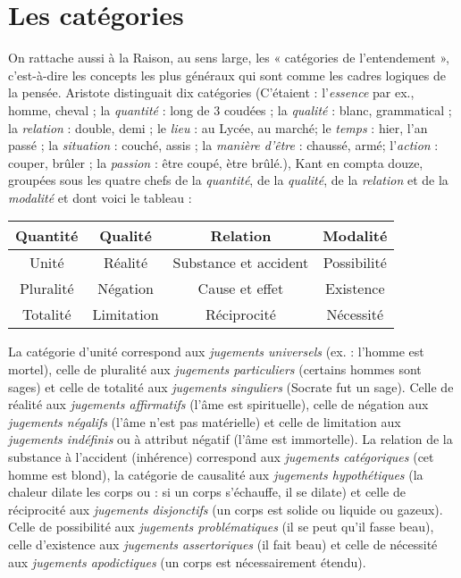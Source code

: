 \section{Les catégories}%
On rattache aussi à la Raison, au sens
large, les « catégories de l’entendement », c’est-à-dire les concepts les
plus généraux qui sont comme les cadres logiques de la pensée.
Aristote distinguait dix catégories {\scriptsize (C'étaient : l'{\it essence} par ex., homme, cheval ; la {\it quantité} : long de 3 coudées ; la
{\it qualité} : blanc, grammatical ; la {\it relation} : double, demi ; le {\it lieu} : au Lycée, au marché;
le {\it temps} : hier, l’an passé ; la {\it situation} : couché, assis ; la {\it manière d'être} : chaussé, armé;
l'{\it action} : couper, brûler ; la {\it passion} : être coupé, ètre brûlé.)}, Kant en compta douze, groupées
sous les quatre chefs de la {\it quantité}, de la {\it qualité}, de la {\it relation} et de la
{\it modalité} et dont voici le tableau :

\begin{center}
\begin{tabular}{ | c | c | c | c | }
  \hline
 Quantité & Qualité & Relation & Modalité \\
  \hline
 Unité & Réalité & Substance et accident & Possibilité \\
 Pluralité & Négation & Cause et effet & Existence \\
 Totalité & Limitation & Réciprocité & Nécessité \\
  \hline
\end{tabular}
\end{center}

\vspace{0.24cm}
{\footnotesize La catégorie d'unité correspond aux {\it jugements universels} (ex. : l’homme
est mortel), celle de pluralité aux {\it jugements particuliers} (certains hommes
sont sages) et celle de totalité aux {\it jugements singuliers} (Socrate fut un sage).
Celle de réalité aux {\it jugements affirmatifs} (l'âme est spirituelle), celle de négation aux {\it jugements négalifs} (l'âme n’est pas matérielle) et celle de limitation
aux {\it jugements indéfinis} ou à attribut négatif (l’âme est immortelle). La
relation de la substance à l’accident (inhérence) correspond aux {\it jugements
catégoriques} (cet homme est blond), la catégorie de causalité aux {\it jugements
hypothétiques} (la chaleur dilate les corps ou : si un corps s’échauffe, il se
dilate) et celle de réciprocité aux {\it jugements disjonctifs} (un corps est solide
ou liquide ou gazeux). Celle de possibilité aux {\it jugements problématiques}
(il se peut qu'il fasse beau), celle d'existence aux {\it jugements assertoriques}
(il fait beau) et celle de nécessité aux {\it jugements apodictiques} (un corps est
nécessairement étendu).}
\vspace{0.31cm}


